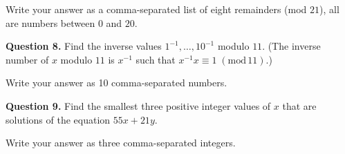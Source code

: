 \documentclass[jou]{apa6}
\begin{document}
Write your answer as a comma-separated list of eight remainders (mod $21$), \textendash{} all are numbers between $0$ and $20$.


\vspace{10pt}
{\bf Question 8.} Find the inverse values $1^{-1},\ldots,10^{-1}$ modulo $11$. (The inverse number of $x$ modulo $11$ 
is $x^{-1}$ such that $x^{-1}x \equiv 1\;(\text{mod}\,11)$.)

Write your answer as 10 comma-separated numbers.


\vspace{10pt}
{\bf Question 9.} Find the smallest three positive integer values of $x$ that
are solutions of the equation $55x + 21y$. 

Write your answer as three comma-separated integers. 
\end{document}
